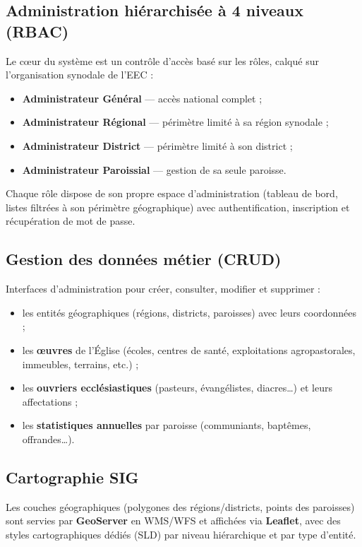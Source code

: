 \documentclass[11pt, a4paper]{article}
\begin{document}
\subsection{Administration hiérarchisée à 4 niveaux (RBAC)}
Le cœur du système est un contrôle d'accès basé sur les rôles, calqué sur l'organisation
synodale de l'EEC :
\begin{itemize}
  \item \textbf{Administrateur Général} --- accès national complet ;
  \item \textbf{Administrateur Régional} --- périmètre limité à sa région synodale ;
  \item \textbf{Administrateur District} --- périmètre limité à son district ;
  \item \textbf{Administrateur Paroissial} --- gestion de sa seule paroisse.
\end{itemize}
Chaque rôle dispose de son propre espace d'administration (tableau de bord, listes filtrées
à son périmètre géographique) avec authentification, inscription et récupération de mot de
passe.

\subsection{Gestion des données métier (CRUD)}
Interfaces d'administration pour créer, consulter, modifier et supprimer :
\begin{itemize}
  \item les entités géographiques (régions, districts, paroisses) avec leurs coordonnées ;
  \item les \textbf{œuvres} de l'Église (écoles, centres de santé, exploitations agropastorales, immeubles, terrains, etc.) ;
  \item les \textbf{ouvriers ecclésiastiques} (pasteurs, évangélistes, diacres\ldots) et leurs affectations ;
  \item les \textbf{statistiques annuelles} par paroisse (communiants, baptêmes, offrandes\ldots).
\end{itemize}

\subsection{Cartographie SIG}
Les couches géographiques (polygones des régions/districts, points des paroisses) sont
servies par \textbf{GeoServer} en WMS/WFS et affichées via \textbf{Leaflet}, avec des styles
cartographiques dédiés (SLD) par niveau hiérarchique et par type d'entité.
\end{document}
